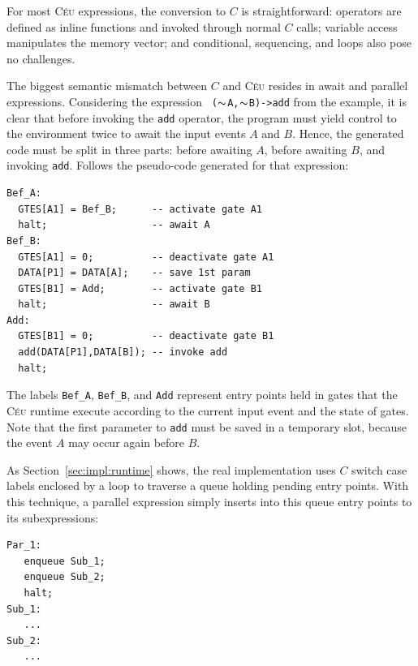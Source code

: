 \documentclass{sig-alternate-ipsn09}
\newcommand{\2}{\;\;}
\newcommand{\5}{\;\;\;\;\;}
\newcommand{\til}{$\thicksim$}
\newcommand{\CEU}{\textsc{C\'{e}u}}
\newcommand{\code}[1] {{\small{\texttt{#1}}}}
\begin{document}
For most \CEU{} expressions, the conversion to $C$ is straightforward:
operators are defined as inline functions and invoked through normal $C$ calls;
variable access manipulates the memory vector;
and conditional, sequencing, and loops also pose no challenges.

The biggest semantic mismatch between $C$ and \CEU{} resides in await and 
parallel expressions.
Considering the expression \code{~(\til{}A,\til{}B)->add} from the example, it 
is clear that before invoking the \code{add} operator, the program must yield 
control to the environment twice to await the input events $A$ and $B$.
Hence, the generated code must be split in three parts: before awaiting $A$, 
before awaiting $B$, and invoking \code{add}.
Follows the pseudo-code generated for that expression:

\begin{Verbatim}[commandchars=\\\{\}]
Bef_A:
  GTES[A1] = Bef_B;      -- activate gate A1
  halt;                  -- await A
Bef_B:
  GTES[A1] = 0;          -- deactivate gate A1
  DATA[P1] = DATA[A];    -- save 1st param
  GTES[B1] = Add;        -- activate gate B1
  halt;                  -- await B
Add:
  GTES[B1] = 0;          -- deactivate gate B1
  add(DATA[P1],DATA[B]); -- invoke add
  halt;
\end{Verbatim}

The labels \code{Bef\_A}, \code{Bef\_B}, and \code{Add} represent entry points 
held in gates that the \CEU{} runtime execute according to the current input 
event and the state of gates.
Note that the first parameter to \code{add} must be saved in a temporary slot, 
because the event $A$ may occur again before $B$.

As Section~\ref{sec:impl:runtime} shows, the real implementation uses $C$ 
switch case labels enclosed by a loop to traverse a queue holding pending entry 
points.
With this technique, a parallel expression simply inserts into this queue entry 
points to its subexpressions:

\begin{Verbatim}[commandchars=\\\{\}]
Par_1:
   enqueue Sub_1;
   enqueue Sub_2;
   halt;
Sub_1:
   ...
Sub_2:
   ...
\end{Verbatim}

\end{document}
